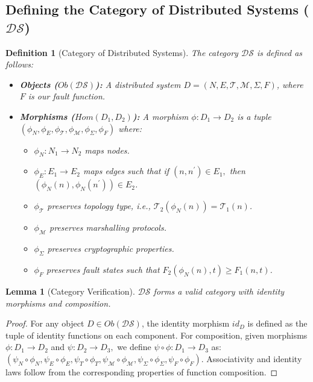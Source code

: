 \documentclass[10pt]{article}
\newtheorem{lemma}[theorem]{Lemma}
\newtheorem{definition}[theorem]{Definition
}
\begin{document}
\subsection{Defining the Category of Distributed Systems ($\mathcal{DS}$)}
\begin{definition}[Category of Distributed Systems]
The category $\mathcal{DS}$ is defined as follows:
\begin{itemize}
    \item \textbf{Objects ($Ob(\mathcal{DS})$):} A distributed system $D=(N,E,\mathcal{T},\mathcal{M},\Sigma,F)$, where $F$ is our fault function.
    \item \textbf{Morphisms ($Hom(D_{1},D_{2})$):} A morphism $\phi:D_{1}\rightarrow D_{2}$ is a tuple $(\phi_{N},\phi_{E},\phi_{\mathcal{T}},\phi_{\mathcal{M}},\phi_{\Sigma},\phi_{F})$ where:
        \begin{itemize}
            \item $\phi_{N}:N_{1}\rightarrow N_{2}$ maps nodes.
            \item $\phi_{E}:E_{1}\rightarrow E_{2}$ maps edges such that if $(n,n^{\prime})\in E_{1},$ then $(\phi_{N}(n),\phi_{N}(n^{\prime}))\in E_{2}$.
            \item $\phi_{\mathcal{T}}$ preserves topology type, i.e., $\mathcal{T}_{2}(\phi_{N}(n))=\mathcal{T}_{1}(n)$.
            \item $\phi_{\mathcal{M}}$ preserves marshalling protocols.
            \item $\phi_{\Sigma}$ preserves cryptographic properties.
            \item $\phi_{F}$ preserves fault states such that $F_{2}(\phi_{N}(n),t)\ge F_{1}(n,t)$.
        \end{itemize}
\end{itemize}
\end{definition}
\begin{lemma}[Category Verification]
$\mathcal{DS}$ forms a valid category with identity morphisms and composition.
\end{lemma}
\begin{proof}
For any object $D\in Ob(\mathcal{DS})$, the identity morphism $id_{D}$ is defined as the tuple of identity functions on each component. For composition, given morphisms $\phi:D_{1}\rightarrow D_{2}$ and $\psi:D_{2}\rightarrow D_{3},$ we define $\psi\circ\phi:D_{1}\rightarrow D_{3}$ as: $(\psi_{N}\circ\phi_{N},\psi_{E}\circ\phi_{E},\psi_{T}\circ\phi_{T},\psi_{\mathcal{M}}\circ\phi_{\mathcal{M}},\psi_{\Sigma}\circ\phi_{\Sigma},\psi_{F}\circ\phi_{F})$. Associativity and identity laws follow from the corresponding properties of function composition.
\end{proof}
\end{document}

